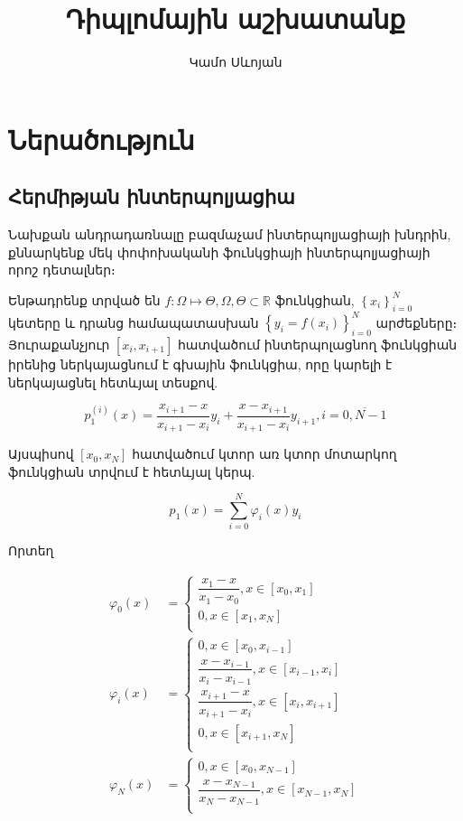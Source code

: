 \documentclass[fleqn, bachelor,subf,12pt,notitlepage]{disser}
\title{Դիպլոմային աշխատանք}
\author{Կամո Սևոյան}
\date{}
\begin{document}
\section*{Ներածություն}
\subsection*{Հերմիթյան ինտերպոլյացիա}


Նախքան անդրադառնալը բազմաչամ ինտերպոլյացիայի խնդրին, քննարկենք մեկ փոփոխականի ֆունկցիայի ինտերպոլյացիայի որոշ դետալներ։ 

Ենթադրենք տրված են $f:\Omega \mapsto \Theta, \Omega, \Theta \subset \mathbb{R}$ ֆունկցիան,  $\left\{x_{i}\right\}_{i=0}^{N}$ կետերը և դրանց համապատասխան $\left\{y_{i}=f\left(x_{i}\right)\right\}_{i=0}^{N}$ արժեքները։ Յուրաքանչյուր $\left[x_{i}, x_{i+1}\right]$ հատվածում \newline ինտերպոլացնող ֆունկցիան իրենից ներկայացնում է գխային ֆունկցիա, որը կարելի է ներկայացնել հետևյալ տեսքով.

$$p_{1}^{(i)}\left(x\right)=\dfrac{x_{i+1}-x}{x_{i+1}-x_{i}}y_{i}+\dfrac{x-x_{i+1}}{x_{i+1}-x_{i}}y_{i+1}, i=\overline{0, N-1}$$

Այսպիսով $\left[x_{0}, x_{N}\right]$ հատվածում կտոր առ կտոր մոտարկող ֆունկցիան տրվում է հետևյալ կերպ.

$$p_{1}\left(x\right)=\sum_{i=0}^{N}\varphi_{i} \left(x\right)y_{i}$$

Որտեղ 

\begin{align*}
\varphi_{0}\left(x\right)&=\begin{cases}
\dfrac{x_{1}-x}{x_{1}-x_{0}}, x\in \left[x_{0}, x_{1}\right]\\
0, x\in \left[x_{1}, x_{N}\right]\\
\end{cases}\\
\varphi_{i}\left(x\right)&=\begin{cases}
0, x\in \left[x_{0}, x_{i-1}\right]\\
\dfrac{x-x_{i-1}}{x_{i}-x_{i-1}}, x\in \left[x_{i-1}, x_{i}\right]\\
\dfrac{x_{i+1}-x}{x_{i+1}-x_{i}}, x\in \left[x_{i}, x_{i+1}\right]\\
0, x\in \left[x_{i+1}, x_{N}\right]\\
\end{cases}\\
\varphi_{N}\left(x\right)&=\begin{cases}
0, x\in \left[x_{0}, x_{N-1}\right]\\
\dfrac{x-x_{N-1}}{x_{N}-x_{N-1}}, x\in \left[x_{N-1}, x_{N}\right]\\
\end{cases}
\end{align*}
\end{document}
